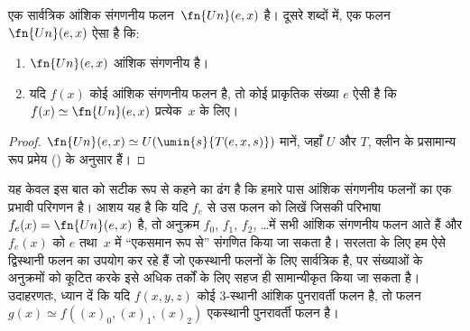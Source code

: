 \documentclass[../../../include/open-logic-section]{subfiles}
\begin{document}

\begin{thm}
एक सार्वत्रिक आंशिक संगणनीय फलन~$\fn{Un}(e,x)$ है। दूसरे शब्दों में,
एक फलन $\fn{Un}(e,x)$ ऐसा है कि:
\begin{enumerate}
\item $\fn{Un}(e,x)$ आंशिक संगणनीय है।
\item यदि $f(x)$ कोई आंशिक संगणनीय फलन है, तो कोई प्राकृतिक संख्या
$e$ ऐसी है कि $f(x) \simeq \fn{Un}(e,x)$ प्रत्येक~$x$ के लिए।
\end{enumerate}
\end{thm}

\begin{proof}
$\fn{Un}(e,x) \simeq U(\umin{s}{T(e,x,s)})$ मानें, जहाँ $U$ और $T$,
क्लीन के प्रसामान्य रूप प्रमेय () के अनुसार हैं।
\end{proof}

\begin{explain}
यह केवल इस बात को सटीक रूप से कहने का ढंग है कि हमारे पास आंशिक संगणनीय
फलनों का एक प्रभावी परिगणन है। आशय यह है कि यदि $f_e$ से उस फलन को
लिखें जिसकी परिभाषा $f_e(x) = \fn{Un}(e,x)$ है, तो अनुक्रम $f_0$,
$f_1$, $f_2$, \dots में सभी आंशिक संगणनीय फलन आते हैं और $f_e(x)$ को
$e$ तथा~$x$ में ``एकसमान रूप से'' संगणित किया जा सकता है। सरलता के लिए
हम ऐसे द्विस्थानी फलन का उपयोग कर रहे हैं जो एकस्थानी फलनों के लिए
सार्वत्रिक है, पर संख्याओं के अनुक्रमों को कूटित करके इसे अधिक तर्कों के
लिए सहज ही सामान्यीकृत किया जा सकता है। उदाहरणतः, ध्यान दें कि यदि
$f(x,y,z)$ कोई $3$-स्थानी आंशिक पुनरावर्ती फलन है, तो फलन
$g(x) \simeq f((x)_0, (x)_1, (x)_2)$ एकस्थानी पुनरावर्ती फलन है।
\end{explain}
\end{document}
